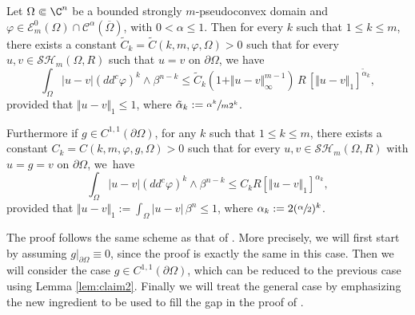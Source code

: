 \begin{lemma}\label{lem:ModC} Let $\Omega \Subset \C^n$ be a bounded strongly $m$-pseudoconvex domain and $\varphi\in \mathcal{E}^0_m (\Omega)\cap \mathcal{C}^{\alpha} (\overline\Omega)$, with $ 0 < \alpha \leq 1$. Then for every $k$ such that $1 \leq k \leq m$, there exists a constant $\tilde C_k = \tilde C (k,m,\varphi, \Omega) >0$ such that for every $u,v\in \mathcal{SH}_m (\Omega,R)$ such that $u = v$ on $\partial \Omega$, we have
\begin{equation} \label{eq:MocEst2}
\int_{\Omega}|u-v| (dd^c\varphi)^k\wedge\beta^{n-k}\leq \tilde C_k (1 + \Vert u - v\Vert_{\infty}^{m-1}) \, R \, \left[\Vert u-v \Vert_1\right]^{\tilde \alpha_k },
\end{equation}
provided that $\Vert u-v \Vert_1 \leq 1$, where $\tilde \alpha_k := \sfrac{\alpha^k}{m 2^k} $.

Furthermore if $g \in C^{1,1} (\partial \Omega)$, for any $k$ such that $1 \leq k\leq m$, there exists a constant $C_k = C (k,m, \varphi,g,\Omega) > 0$ such that for every $u, v \in \mathcal{SH}_m (\Omega,R)$ with $u = g = v$ on $\partial \Omega$, we~have
\begin{equation} \label{eq:MocEst1}
\int_{\Omega}|u-v|(dd^c\varphi)^k\wedge\beta^{n-k}\leq C_k R \left[\Vert u-v \Vert_1\right]^{\alpha_k},
\end{equation}
provided that $\Vert u-v \Vert_1 := \int_{\Omega} \vert u - v\vert \, \beta^n \leq 1$, where $\alpha_k := 2 (\sfrac{\alpha}{ 2})^k$.
\end{lemma}

The proof follows the same scheme as that of \cite[Lem.\,4.2]{BZ20}. More precisely,
we will first start by assuming $g|_{\partial \Omega} \equiv 0$, since the proof is exactly the same in this case.
Then we will consider the case $g\in C^{1,1} (\partial \Omega)$, which can be reduced to the previous case using Lemma \ref{lem:claim2}.
Finally we will treat the general case by emphasizing the new ingredient to be used to fill the gap in the proof of \cite[Lem.\,4.2]{BZ20}.

